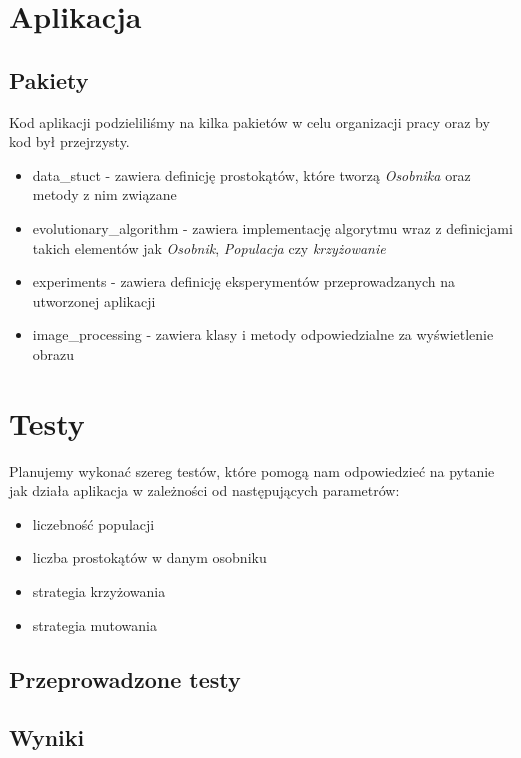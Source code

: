 \documentclass{article}
\begin{document}
\section{Aplikacja}
\subsection{Pakiety}
Kod aplikacji podzieliliśmy na kilka pakietów w celu organizacji pracy oraz by kod był przejrzysty.
\begin{itemize}
    \item data\_stuct - zawiera definicję prostokątów, które tworzą {\it Osobnika} oraz metody z nim związane
    \item evolutionary\_algorithm - zawiera implementację algorytmu wraz z definicjami takich elementów jak {\it Osobnik}, {\it Populacja} czy {\it krzyżowanie}
    \item experiments - zawiera definicję eksperymentów przeprowadzanych na utworzonej aplikacji
    \item image\_processing - zawiera klasy i metody odpowiedzialne za wyświetlenie obrazu
\end{itemize}
\section{Testy}
Planujemy wykonać szereg testów, które pomogą nam odpowiedzieć na pytanie jak działa aplikacja w zależności od następujących parametrów:
\begin{itemize}
    \item liczebność populacji
    \item liczba prostokątów w danym osobniku
    \item strategia krzyżowania
    \item strategia mutowania
\end{itemize}
\subsection{Przeprowadzone testy}
\subsection{Wyniki}
\end{document}
